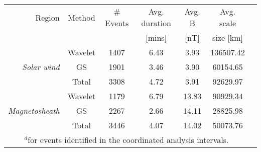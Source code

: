\begin{tabular}{rcccccc}
\hline
Region &   Method &  \# Events &  Avg. duration &  Avg. B &  Avg. scale \\
 &    &   &  [mins] &  [nT] &  size [km] \\
\hline
         	         & Wavelet & 1407 & 6.43 & 3.93  & 136507.42 \\
\textit{Solar wind} 	  & GS 	    & 1901 & 3.46 & 3.90  & 60154.65 \\
         	           & Total   & 3308 & 4.72 & 3.91  & 92629.97 \\
\hline
         	         & Wavelet & 1179 & 6.79 & 13.83 & 90929.34 \\
\textit{Magnetosheath}    & GS      & 2267 & 2.66 & 14.11 & 28825.98 \\
         	         & Total   & 3446 & 4.07 & 14.02 & 50073.76 \\
\hline
\multicolumn{6}{c}{$^d$for events identified in the coordinated analysis intervals.}
\end{tabular}

